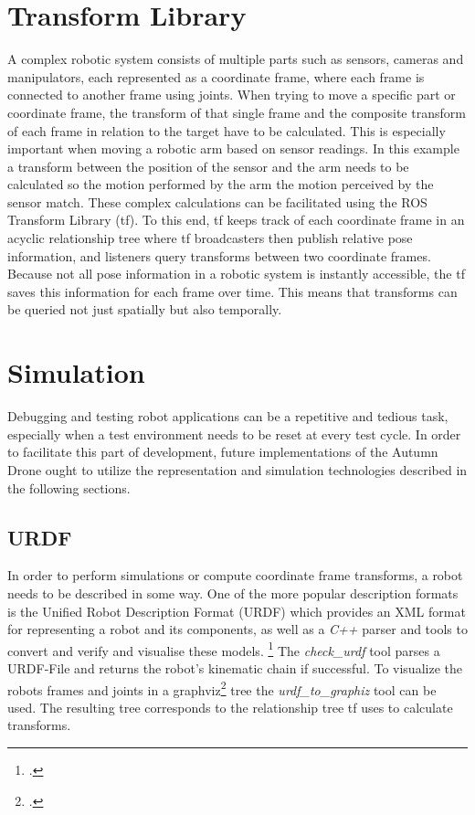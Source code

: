 \section{Transform Library}
A complex robotic system consists of multiple parts such as sensors, cameras and manipulators, each represented as a coordinate frame, where each frame is connected to another frame using joints. When trying to move a specific part or coordinate frame, the transform of that single frame and the composite transform of each frame in relation to the target have to be calculated. This is especially important when moving a robotic arm based on sensor readings. In this example a transform between the position of the sensor and the arm needs to be calculated so the motion performed by the arm the motion perceived by the sensor match.
These complex calculations can be facilitated using the ROS Transform Library (tf). To this end, tf keeps track of each coordinate frame in an acyclic relationship tree where tf broadcasters then publish relative pose information, and listeners query transforms between two coordinate frames. 
Because not all pose information in a robotic system is instantly accessible, the tf saves this information for each frame over time. This means that transforms can be queried not just spatially but also temporally.



\section{Simulation}
Debugging and testing robot applications can be a repetitive and tedious task, especially when a test environment needs to be reset at every test cycle. In order to facilitate this part of development, future implementations of the Autumn Drone ought to utilize the representation and simulation technologies described in the following sections.

\subsection{URDF}
In order to perform simulations or compute coordinate frame transforms, a robot needs to be described in some way. One of the more popular description formats is the Unified Robot Description Format (URDF) which provides an XML format for representing a robot and its components, as well as a \textit{C++} parser and tools to convert and verify and visualise these models. \footcite{openSourceRoboticsFoundationURDFNodate}
The \textit{check\_urdf} tool parses a URDF-File and returns the robot's kinematic chain if successful.
To visualize the robots frames and joints in a graphviz\footcite{graphvizAuthorsAboutNodate} tree the \textit{urdf\_to\_graphiz} tool can be used. The resulting tree corresponds to the relationship tree tf uses to calculate transforms.

